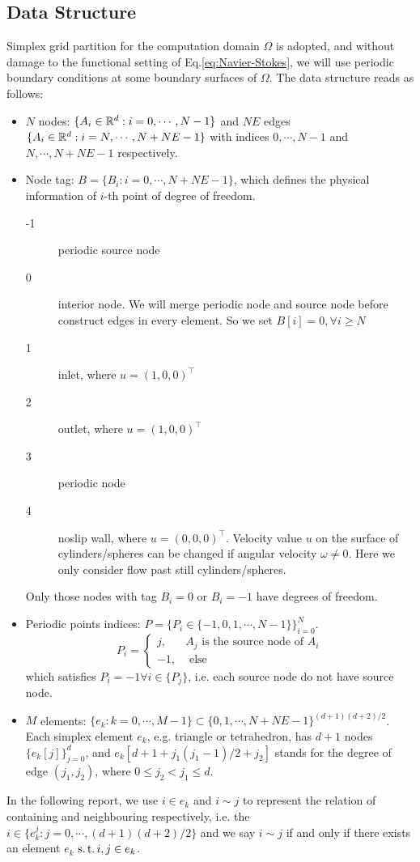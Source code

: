 \subsection{Data Structure}
Simplex grid partition for the computation domain $\Omega$ is adopted, 
and without damage to the functional setting of Eq.\eqref{eq:Navier-Stokes}, 
we will use periodic boundary conditions at some boundary surfaces of $\Omega$.
The data structure reads as follows:
\begin{itemize}
  \item $N$ nodes: $\{A_i\in\mathbb{R}^d:i=0,\cdots,N-1\}$ and 
    $NE$ edges $\{A_i\in\mathbb{R}^d:i=N,\cdots,N+NE-1\}$ 
    with indices $0,\cdots,N-1$ and $N,\cdots,N+NE-1$ respectively.

  \item Node tag: $B=\{B_i:i=0,\cdots,N+NE-1\}$, which defines the physical information of $i$-th point of degree of freedom.
    \begin{description}
      \item[-1] periodic source node
      \item[0] interior node. We will merge periodic node and source node 
        before construct edges in every element. 
        So we set $B[i]=0, \forall i\geq N$
      \item[1] inlet, where $u=(1,0,0)^\top$
      \item[2] outlet, where $u=(1,0,0)^\top$
      \item[3] periodic node
      \item[4] noslip wall, where $u=(0,0,0)^\top$. 
        Velocity value $u$ on the surface of cylinders/spheres can be changed 
        if angular velocity $\omega\neq0$. Here we only consider flow past still cylinders/spheres.
    \end{description}
    Only those nodes with tag $B_i=0$ or $B_i=-1$ have degrees of freedom.

  \item Periodic points indices: $P=\{P_i\in\{-1,0,1,\cdots,N-1\}\}_{i=0}^{N}$.
    \[
      P_i=\left\{\begin{array}{ll}
        j, & A_j \text{ is the source node of } A_i \\
        -1, & \text{ else }
      \end{array}\right.
      \]
    which satisfies $P_i=-1\forall i\in \{P_j\}$, 
    i.e. each source node do not have source node. 

  \item $M$ elements: $\{e_k:k=0,\cdots,M-1\}\subset\{0,1,\cdots,N+NE-1\}^{(d+1)(d+2)/2}$. 
    Each simplex element $e_k$, e.g. triangle or tetrahedron, 
    has $d+1$ nodes $\{e_k[j]\}_{j=0}^{d}$, 
    and $e_k[d+1+j_1(j_1-1)/2+j_2]$ stands for the degree of edge $(j_1,j_2)$, 
    where $0\leq j_2<j_1\leq d$.

\end{itemize}
In the following report, we use $i\in e_k$ and $i\sim j$ to represent the 
relation of containing and neighbouring respectively, i.e.
the $i\in\{e_k^j:j=0,\cdots,(d+1)(d+2)/2\}$ and 
we say $i\sim j$ if and only if there exists an element $e_k$ $\operatorname*{s.t.} i,j\in e_k$.

